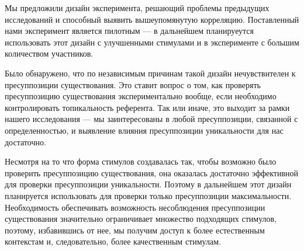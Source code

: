\documentclass[a4paper, 12pt]{article}
\begin{document}
Мы предложили дизайн эксперимента, решающий проблемы предыдущих исследований и способный выявить вышеупомянутую корреляцию. Поставленный нами эксперимент является пилотным — в дальнейшем планируеутся использовать этот дизайн с улучшенными стимулами и в эксперименте с большим количеством участников.

Было обнаружено, что по независимым причинам такой дизайн нечувствителен к пресуппозиции существования. Это ставит вопрос о том, как проверять пресуппозицию существования экспериментально вообще, если необходимо контролировать топикальность референта. Так или иначе, это выходит за рамки нашего исследования — мы заинтересованы в любой пресуппозиции, связанной с определенностью, и выявление влияния пресуппозиции уникальности для нас достаточно. 

Несмотря на то что форма стимулов создавалась так, чтобы возможно было проверить пресуппозицию существования, она оказалась достаточно эффективной для проверки пресуппозиции уникальности. Поэтому в дальнейшем этот дизайн планируется использовать для проверки только пресуппозиции максимальности. Необходимость обеспечивать возможность несоблюдения пресуппозиции существования значительно ограничивает множество подходящих стимулов, поэтому, избавившись от нее, мы получим доступ к более естественным контекстам и, следовательно, более качественным стимулам.

\printbibliography
\end{document}
